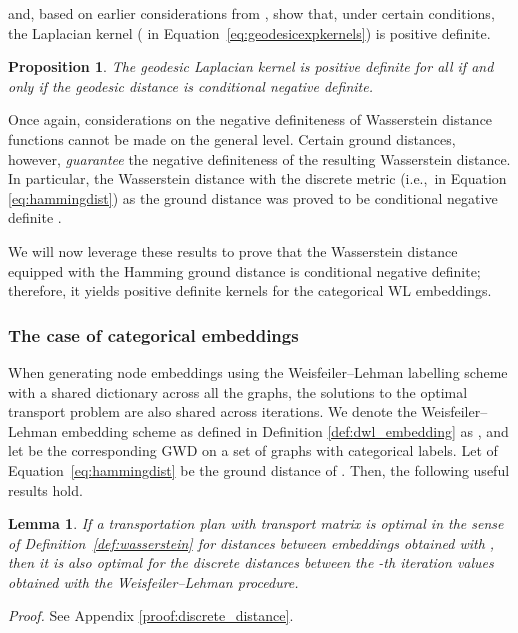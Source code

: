 \documentclass{article}
\newtheorem{proposition}{Proposition}
\newtheorem{lemma}{Lemma}\newtheorem{conjecture}{Conjecture}
\begin{document}
and, based on earlier considerations from \citet{berg1984harmonic}, show that, under certain conditions, the Laplacian kernel ( in Equation~\ref{eq:geodesicexpkernels}) is positive definite.



\begin{proposition}
\citep{feragen2015geodesic}
\label{prop:feragen2}
The geodesic Laplacian kernel is positive definite for all  if and only if the geodesic distance  is conditional negative definite.
\end{proposition}

Once again, considerations on the negative definiteness of Wasserstein distance functions cannot be made on the general level. Certain ground distances, however, \emph{guarantee} the negative definiteness of the resulting Wasserstein distance. In particular, the Wasserstein distance with the discrete metric (i.e.,\  in Equation \ref{eq:hammingdist}) as the ground distance was proved to be conditional negative definite \citep{gardner2017definiteness}.

We will now leverage these results to prove that the Wasserstein distance equipped with the Hamming ground distance is conditional negative definite; therefore, it yields positive definite kernels for the categorical WL embeddings.



\subsubsection{The case of categorical embeddings}
\label{app:discretewwl}
When generating node embeddings using the Weisfeiler--Lehman labelling scheme with a shared dictionary across all the graphs, the solutions to the optimal transport problem are also shared across iterations.
We denote the Weisfeiler--Lehman embedding scheme as defined in Definition \ref{def:dwl_embedding} as , and let  be the corresponding GWD on a set of graphs  with categorical labels. Let  of Equation~\ref{eq:hammingdist} be the ground distance of . Then, the following useful results hold. 

\begin{lemma}
\label{lemma:discrete_distance}
If a transportation plan  with transport matrix  is optimal in the sense of Definition~\ref{def:wasserstein} for distances  between embeddings obtained with , then it is also optimal for the discrete distances  between the -th iteration values obtained with the Weisfeiler--Lehman procedure.
\end{lemma}
\textit{Proof.} See Appendix \ref{proof:discrete_distance}.
\end{document}
